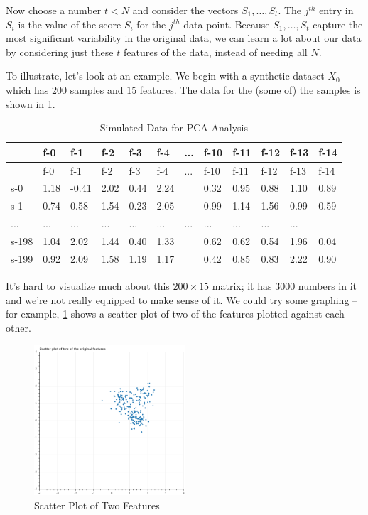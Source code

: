 \documentclass[
]{article}
\begin{document}
Now choose a number \(t<N\) and consider the vectors
\(S_{1},\ldots, S_{t}\). The \(j^{th}\) entry in \(S_{i}\) is the value
of the score \(S_{i}\) for the \(j^{th}\) data point. Because
\(S_{1},\ldots, S_{t}\) capture the most significant variability in the
original data, we can learn a lot about our data by considering just
these \(t\) features of the data, instead of needing all \(N\).

To illustrate, let's look at an example. We begin with a synthetic
dataset \(X_{0}\) which has \(200\) samples and \(15\) features. The
data for the (some of) the samples is shown in \cref{tbl:rawdata}.

\begin{longtable}[]{@{}llllllllllll@{}}
\caption{Simulated Data for PCA Analysis
\label{tbl:rawdata}}\tabularnewline
\toprule
& f-0 & f-1 & f-2 & f-3 & f-4 & ... & f-10 & f-11 & f-12 & f-13 &
f-14\tabularnewline
\midrule
\endfirsthead
\toprule
& f-0 & f-1 & f-2 & f-3 & f-4 & ... & f-10 & f-11 & f-12 & f-13 &
f-14\tabularnewline
\midrule
\endhead
s-0 & 1.18 & -0.41 & 2.02 & 0.44 & 2.24 & & 0.32 & 0.95 & 0.88 & 1.10 &
0.89\tabularnewline
s-1 & 0.74 & 0.58 & 1.54 & 0.23 & 2.05 & & 0.99 & 1.14 & 1.56 & 0.99 &
0.59\tabularnewline
... & ... & ... & ... & ... & ... & ... & ... & ... & ... & ...
&\tabularnewline
s-198 & 1.04 & 2.02 & 1.44 & 0.40 & 1.33 & & 0.62 & 0.62 & 0.54 & 1.96 &
0.04\tabularnewline
s-199 & 0.92 & 2.09 & 1.58 & 1.19 & 1.17 & & 0.42 & 0.85 & 0.83 & 2.22 &
0.90\tabularnewline
\bottomrule
\end{longtable}

It's hard to visualize much about this \(200\times 15\) matrix; it has
\(3000\) numbers in it and we're not really equipped to make sense of
it. We could try some graphing -- for example, \cref{fig:features} shows
a scatter plot of two of the features plotted against each other.

\begin{figure}
\hypertarget{fig:features}{%
\centering
\includegraphics[width=0.5\textwidth,height=\textheight]{../img/features.png}
\caption{Scatter Plot of Two Features}\label{fig:features}
}
\end{figure}
\end{document}
